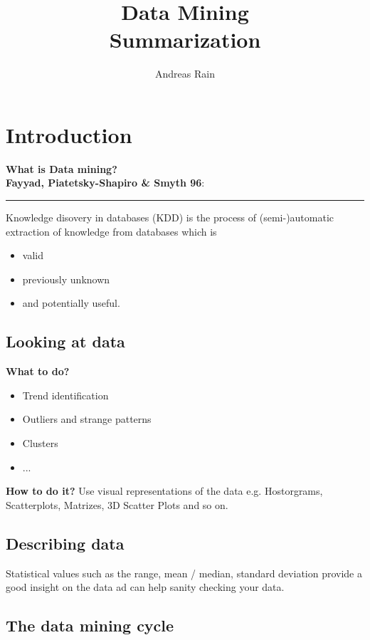 \documentclass[fleqn, oneside, 10pt, titlepage]{article}
\author{Andreas Rain}
\title{Data Mining \\ Summarization}
\newenvironment{shadedSmallerPadding}{
  \def\FrameCommand{\fboxsep=0.3cm \colorbox{MyBoxColor}}
  \MakeFramed {\advance\hsize-1.1\width\FrameRestore}}
{\endMakeFramed}
\begin{document}
\maketitle
\newpage
\tableofcontents
\newpage
\section{Introduction}
\textbf{What is Data mining?}\\
\begin{shadedSmallerPadding}
\textbf{Fayyad, Piatetsky-Shapiro \& Smyth 96}: \\ {\color{gray}\rule{\textwidth}{0.2pt}}

Knowledge disovery in databases (KDD) is the process of
(semi-)automatic extraction of knowledge from databases which is

\begin{itemize}
	\item valid
	\item previously unknown
	\item and potentially useful.
\end{itemize}
\end{shadedSmallerPadding}

\subsection{Looking at data}
\textbf{What to do?}
\begin{itemize}
	\item Trend identification
	\item Outliers and strange patterns
	\item Clusters
	\item ...
\end{itemize}

\textbf{How to do it?} Use visual representations of the data e.g. Hostorgrams, Scatterplots, Matrizes, 3D Scatter Plots and so on.

\subsection{Describing data}
Statistical values such as the range, mean / median, standard deviation provide a good insight on the data ad can help sanity checking your data.

\subsection{The data mining cycle}
\end{document}
